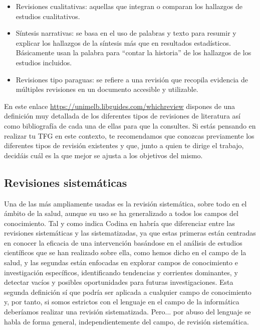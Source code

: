 \begin{itemize}
\begin{itemize}
        \item Revisiones cualitativas: aquellas que integran o comparan los hallazgos de estudios cualitativos.
        
        \item Síntesis narrativas: se basa en el uso de palabras y texto para resumir y explicar los hallazgos de la síntesis más que en resultados estadísticos. Básicamente usan la palabra para ``contar la historia'' de los hallazgos de los estudios incluidos.

        \item Revisiones tipo paraguas: se refiere a una revisión que recopila evidencia de múltiples revisiones en un documento accesible y utilizable. 
        
    \end{itemize}
\end{itemize}

En este enlace \url{https://unimelb.libguides.com/whichreview} dispones de una definición muy detallada de los diferentes tipos de revisiones de literatura así como bibliografía de cada una de ellas para que la consultes. Si estás pensando en realizar tu TFG en este contexto, te recomendamos que conozcas previamente los diferentes tipos de revisión existentes y que, junto a quien te dirige el trabajo, decidáis cuál es la que mejor se ajusta a los objetivos del mismo.

\subsection{Revisiones sistemáticas}

Una de las más ampliamente usadas es la revisión sistemática, sobre todo en el ámbito de la salud, aunque su uso se ha generalizado a todos los campos del conocimiento. Tal y como indica Codina en \cite{codina2018lluis} habría que diferenciar entre las revisiones sistemáticas y las sistematizadas, ya que estas primeras están centradas en conocer la eficacia de una intervención basándose en el análisis de estudios científicos que se han realizado sobre ella, como hemos dicho en el campo de la salud, y las segundas están enfocadas en explorar campos de conocimiento e investigación específicos, identificando  tendencias y corrientes dominantes, y detectar vacíos y posibles oportunidades para futuras investigaciones. Esta segunda definición sí que podría ser aplicada a cualquier campo de conocimiento y, por tanto, si somos estrictos con el lenguaje en el campo de la informática deberíamos realizar una revisión sistematizada. Pero... por abuso del lenguaje se habla de forma general, independientemente del campo, de revisión sistemática. 

